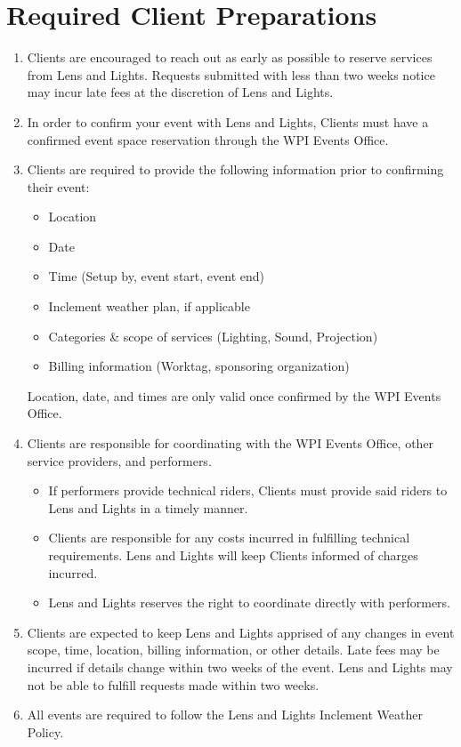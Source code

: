 \section{Required Client Preparations}
\begin{enumerate}
    \item Clients are encouraged to reach out as early as possible to reserve
        services from Lens and Lights. Requests submitted with less than two
        weeks notice may incur late fees at the discretion of Lens and Lights.
    \item In order to confirm your event with Lens and Lights, Clients must
have a confirmed event space reservation through the WPI Events Office.

\item Clients are required to provide the following information prior to
    confirming their event:
    \begin{itemize}
        \item Location
        \item Date
        \item Time (Setup by, event start, event end)
        \item Inclement weather plan, if applicable
        \item Categories \& scope of services (Lighting, Sound, Projection)
        \item Billing information (Worktag, sponsoring organization)
    \end{itemize}

    Location, date, and times are only valid once confirmed by the WPI Events
    Office.

\item Clients are responsible for coordinating with the WPI Events Office,
    other service providers, and performers.
    \begin{itemize}
        \item If performers provide technical riders, Clients must provide said
            riders to Lens and Lights in a timely manner.
        \item Clients are responsible for any costs incurred in fulfilling
            technical requirements. Lens and Lights will keep Clients informed
            of charges incurred.
        \item Lens and Lights reserves the right to coordinate directly with
            performers.
    \end{itemize}

\item Clients are expected to keep Lens and Lights apprised of any changes in
    event scope, time, location, billing information, or other details. Late
    fees may be incurred if details change within two weeks of the event. Lens
    and Lights may not be able to fulfill requests made within two weeks.

\item All events are required to follow the Lens and Lights Inclement Weather
    Policy.
\end{enumerate}

